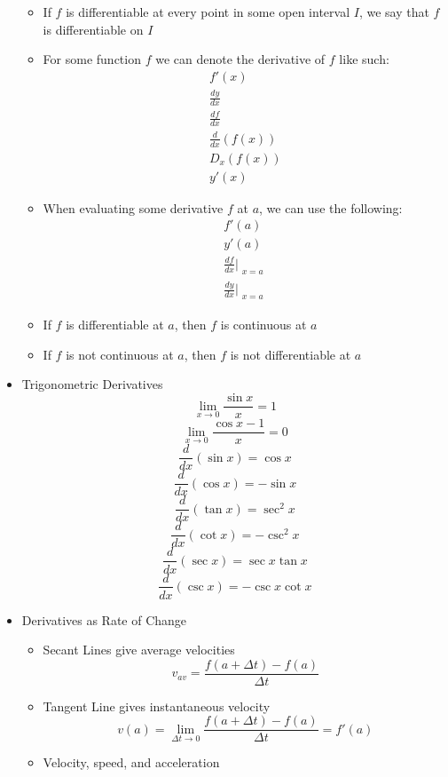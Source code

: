 \documentclass{article}
\begin{document}
\begin{itemize}
\begin{itemize}
        \item If $f$ is differentiable at every point in some open interval $I$, we say that $f$ is differentiable on $I$
        \item For some function $f$ we can denote the derivative of $f$ like such:
        \begin{eqnarray}
            f'(x) \\
            \frac{dy}{dx} \\
            \frac{df}{dx} \\
            \frac{d}{dx}(f(x)) \\
            D_x (f(x)) \\
            y'(x)
        \end{eqnarray}
        \item When evaluating some derivative $f$ at $a$, we can use the following:
        \begin{eqnarray}
            f'(a) \\
            y'(a) \\
            \frac{df}{dx}\Bigr|_{\substack{x=a}} \\
            \frac{dy}{dx}\Bigr|_{\substack{x=a}}
        \end{eqnarray}
        \item If $f$ is differentiable at $a$, then $f$ is continuous at $a$
        \item If $f$ is not continuous at $a$, then $f$ is not differentiable at $a$
    \end{itemize}
    \item Trigonometric Derivatives
    $$\lim_{x \to 0}{\frac{\sin{x}}{x}} = 1$$
    $$\lim_{x \to 0}{\frac{\cos{x} - 1}{x}} = 0$$
    $$\frac{d}{dx}\left(\sin{x}\right) = \cos{x}$$
    $$\frac{d}{dx}\left(\cos{x}\right) = - \sin{x}$$
    $$\frac{d}{dx}\left(\tan{x}\right) = \sec^2{x}$$
    $$\frac{d}{dx}\left(\cot{x}\right) = - \csc^2{x}$$
    $$\frac{d}{dx}\left(\sec{x}\right) = \sec{x}\tan{x}$$
    $$\frac{d}{dx}\left(\csc{x}\right) = - \csc{x}\cot{x}$$
    \item Derivatives as Rate of Change
    \begin{itemize}
        \item Secant Lines give average velocities
        $$v_{av} = \frac{f(a + \Delta t) - f(a)}{\Delta t}$$
        \item Tangent Line gives instantaneous velocity
        $$v(a) = \lim_{\Delta t \to 0}{\frac{f(a + \Delta t) - f(a)}{\Delta t}} = f'(a)$$
        \item Velocity, speed, and acceleration

\end{itemize}
\end{itemize}
\end{document}
